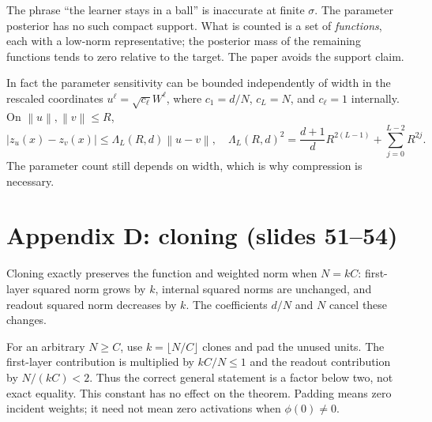 \documentclass[11pt]{article}
\newcommand{\norm}[1]{\left\lVert#1\right\rVert}
\begin{document}
The phrase ``the learner stays in a ball'' is inaccurate at finite $\sigma$. The parameter posterior has no such compact support. What is counted is a set of \emph{functions}, each with a low-norm representative; the posterior mass of the remaining functions tends to zero relative to the target. The paper avoids the support claim.

In fact the parameter sensitivity can be bounded independently of width in the rescaled coordinates $u^\ell=\sqrt{c_\ell}W^\ell$, where $c_1=d/N$, $c_L=N$, and $c_\ell=1$ internally. On $\norm{u},\norm{v}\leq R$,
\[
 |z_u(x)-z_v(x)|\leq\Lambda_L(R,d)\norm{u-v},\quad
 \Lambda_L(R,d)^2=\frac{d+1}{d}R^{2(L-1)}+\sum_{j=0}^{L-2}R^{2j}.
\]
The parameter count still depends on width, which is why compression is necessary.

\section{Appendix D: cloning (slides 51--54)}
Cloning exactly preserves the function and weighted norm when $N=kC$: first-layer squared norm grows by $k$, internal squared norms are unchanged, and readout squared norm decreases by $k$. The coefficients $d/N$ and $N$ cancel these changes.

For an arbitrary $N\geq C$, use $k=\lfloor N/C\rfloor$ clones and pad the unused units. The first-layer contribution is multiplied by $kC/N\leq1$ and the readout contribution by $N/(kC)<2$. Thus the correct general statement is a factor below two, not exact equality. This constant has no effect on the theorem. Padding means zero incident weights; it need not mean zero activations when $\phi(0)\ne0$.
\end{document}

